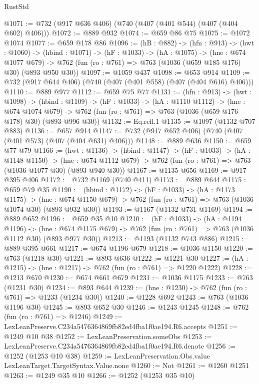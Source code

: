 \begin{lexlean}{RustStd}
\begin{coremodule}
@1071 := @732 (@917 @636 @406) (@740 (@407 (@401 @544) (@407 (@404 @602) @406)))
@1072 := @889 @932
@1074 := @659 @86 @75
@1075 := @1072 @1074
@1077 := @659 @178 @86
@1096 := (hB : @882) ->
  (hfn : @913) ->
  (hwt : @1060) ->
  (hbind : @1071) ->
  (hF : @1033) ->
  (hA : @1075) ->
  (hne : @674 @1077 @679) ->
  @762 (fun (ro : @761) => @763 (@1036 (@659 @185 @176) @30) (@893 @950 @30))
@1097 := @1059 @437
@1098 := @653 @914
@1109 := @732 (@917 @644 @406) (@740 (@407 (@401 @558) (@407 (@404 @616) @406)))
@1110 := @889 @977
@1112 := @659 @75 @77
@1131 := (hfn : @913) ->
  (hwt : @1098) ->
  (hbind : @1109) ->
  (hF : @1033) ->
  (hA : @1110 @1112) ->
  (hne : @674 @1074 @679) ->
  @762 (fun (ro : @761) => @763 (@1036 (@659 @176 @178) @30) (@893 @996 @30))
@1132 := Eq.refl.{1}
@1135 := @1097 (@1132 @707 @883)
@1136 := @657 @914
@1147 := @732 (@917 @652 @406) (@740 (@407 (@401 @573) (@407 (@404 @631) @406)))
@1148 := @889 @636
@1150 := @659 @77 @79
@1166 := (hwt : @1136) ->
  (hbind : @1147) ->
  (hF : @1033) ->
  (hA : @1148 @1150) ->
  (hne : @674 @1112 @679) -> @762 (fun (ro : @761) => @763 (@1036 @1077 @30) (@893 @940 @30))
@1167 := @1135 @656
@1169 := @917 @395 @406
@1172 := @732 @1169 (@740 @411)
@1173 := @889 @644
@1175 := @659 @79 @35
@1190 := (hbind : @1172) ->
  (hF : @1033) ->
  (hA : @1173 @1175) ->
  (hne : @674 @1150 @679) -> @762 (fun (ro : @761) => @763 (@1036 @1074 @30) (@893 @932 @30))
@1193 := @1167 (@1132 @731 @1169)
@1194 := @889 @652
@1196 := @659 @35 @10
@1210 := (hF : @1033) ->
  (hA : @1194 @1196) ->
  (hne : @674 @1175 @679) -> @762 (fun (ro : @761) => @763 (@1036 @1112 @30) (@893 @977 @30))
@1213 := @1193 (@1132 @743 @886)
@1215 := @889 @395 @661
@1217 := @674 @1196 @679
@1218 := @1036 @1150
@1220 := @763 (@1218 @30)
@1221 := @893 @636
@1222 := @1221 @30
@1227 := (hA : @1215) -> (hne : @1217) -> @762 (fun (ro : @761) => @1220 @1222)
@1228 := @1213 @670
@1230 := @674 @661 @679
@1231 := @1036 @1175
@1233 := @763 (@1231 @30)
@1234 := @893 @644
@1239 := (hne : @1230) -> @762 (fun (ro : @761) => @1233 (@1234 @30))
@1240 := @1228 @692
@1243 := @763 (@1036 @1196 @30)
@1245 := @893 @652 @30
@1246 := @1243 @1245
@1248 := @762 (fun (ro : @761) => @1246)
@1249 := LexLeanPreserve.C234a5476364869fb82ed4fba1f0ae194.R6.accepts
@1251 := @1249 @10 @38
@1252 := LexLeanPreservation.someObs
@1253 := LexLeanPreserve.C234a5476364869fb82ed4fba1f0ae194.R6.denote
@1256 := @1252 (@1253 @10 @38)
@1259 := LexLeanPreservation.Obs.value LexLeanTarget.TargetSyntax.Value.none
@1260 := Not
@1261 := @1260 @1251
@1263 := @1249 @35 @10
@1266 := @1252 (@1253 @35 @10)

\end{coremodule}
\end{lexlean}
